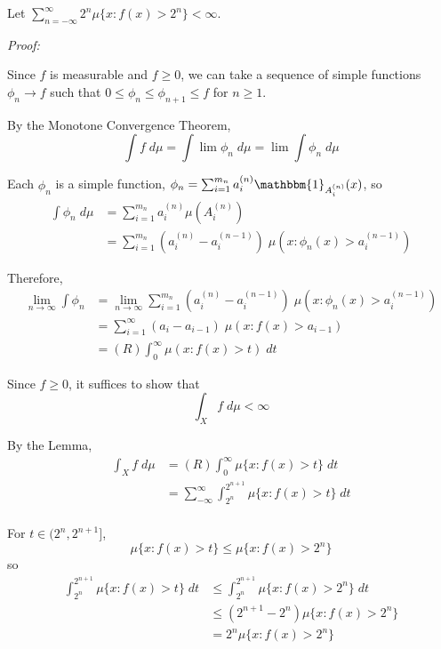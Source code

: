 \documentclass[12pt]{article}
\newcommand{\ind}{\mathbbm{1}}
\newenvironment*{tbox}[2][gray]{
    \begin{tcolorbox}[
        parbox=false,
        colback=#1!5!white,
        colframe=#1!75!black,
        breakable,
        title={#2}
    ]}
    {\end{tcolorbox}}
\begin{document}
        Let $\sum_{n=-\infty}^{\infty} 2^n \mu\{x: f(x) > 2^n\} < \infty$. 

        \begin{tbox}[blue]{\textbf{Lemma:} If $f \geq 0$, 
            \[\int_X f \; d\mu = (R)\int_0^{\infty} \mu\{x: f(x) > t\} \; dt\]}
            \emph{Proof:}
            
            Since $f$ is measurable and $f \geq 0$, we can take a sequence of simple functions $\phi_n \to f$ such that $0 \leq \phi_n \leq \phi_{n+1} \leq f$ for $n \geq 1$. 

            By the Monotone Convergence Theorem,
            \[\int f \; d\mu = \int \lim \phi_n \; d\mu = \lim \int \phi_n \; d\mu\]

            Each $\phi_n$ is a simple function, $\phi_n = \sum_{i=1}^{m_n} a_i^{(n)} \ind_{A_i^{(n)}}(x)$, so
            \begin{align*}
                \int \phi_n \; d\mu &= \sum_{i=1}^{m_n} a_i^{(n)} \mu(A_i^{(n)})\\ 
                    &= \sum_{i=1}^{m_n} (a_i^{(n)} - a_i^{(n-1)})\; \mu(x: \phi_n(x) > a_i^{(n-1)})
            \end{align*}

            Therefore, 
            \begin{align*}
                \lim_{n \to \infty} \int \phi_n &= \lim_{n \to \infty} \sum_{i=1}^{m_n} (a_i^{(n)} - a_i^{(n-1)})\; \mu(x: \phi_n(x) > a_i^{(n-1)})\\ 
                &= \sum_{i=1}^{\infty} (a_i - a_{i-1})\; \mu(x: f(x) > a_{i-1})\\  
                &= (R)\int_0^{\infty} \mu(x: f(x) > t) \; dt
            \end{align*}            
        \end{tbox}

        Since $f\geq 0$, it suffices to show that 
        \[\int_X f \; d\mu < \infty\]

        By the Lemma, 
        \begin{align*}
            \int_X f \; d\mu &= (R)\int_0^{\infty} \mu\{x: f(x) > t\} \; dt\\ 
            & = \sum_{-\infty}^{\infty} \int_{2^n}^{2^{n+1}} \mu\{x: f(x) > t\} \; dt\\
        \end{align*}

        For $t \in (2^n, 2^{n+1}]$, 
        \[\mu\{x: f(x) > t\} \leq \mu\{x: f(x) > 2^n\}\] 
        so 
        \begin{align*}
            \int_{2^n}^{2^{n+1}} \mu\{x: f(x) > t\} \; dt &\leq \int_{2^n}^{2^{n+1}} \mu\{x: f(x) > 2^n\} \; dt\\ 
                &\leq (2^{n+1} - 2^n) \mu\{x: f(x) > 2^n\}\\ 
                &= 2^n\mu\{x: f(x) > 2^n\} 
        \end{align*}
\end{document}
